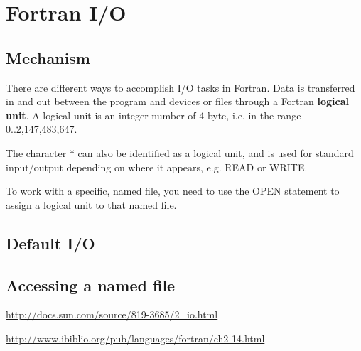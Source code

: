 
\chapter{Fortran I/O}
\label{chap:fortran-io}


\section{Mechanism}
\label{sec:mechanism}

There are different ways to accomplish I/O tasks in Fortran. Data is
transferred in and out between the program and devices or files
through a Fortran {\bf logical unit}. A logical unit is an integer
number of 4-byte, i.e. in the range 0..2,147,483,647.

The character * can also be identified as a logical unit, and is used
for standard input/output depending on where it appears, e.g. READ or
WRITE.

To work with a specific, named file, you need to use the OPEN
statement to assign a logical unit to that named file. 

\section{Default I/O}
\label{sec:default-io}


\section{Accessing a named file}
\label{sec:accessing-named-file}

\url{http://docs.sun.com/source/819-3685/2_io.html}

\url{http://www.ibiblio.org/pub/languages/fortran/ch2-14.html}


